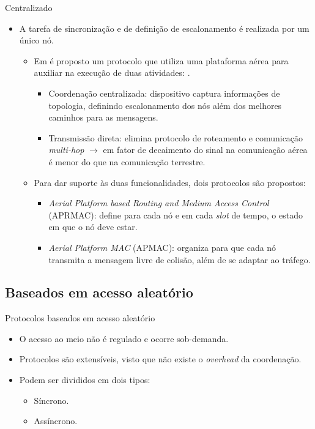 \documentclass{beamer}
\begin{document}
\begin{frame}[allowframebreaks]{Centralizado}
\hypertarget{aerial_back}{}
  \begin{itemize}
    \item A tarefa de sincronização e de definição de escalonamento é realizada por um único nó.
    \begin{itemize}
      \item Em \cite{20100312645920} é proposto um protocolo que utiliza uma plataforma aérea para auxiliar na execução de duas atividades: \hyperlink{aerial}{}.
      \begin{itemize}
	\item Coordenação centralizada: dispositivo captura informações de topologia, definindo escalonamento dos nós além dos melhores caminhos para as mensagens.
	\item Transmissão direta: elimina protocolo de roteamento e comunicação \emph{multi-hop} $\rightarrow$ em fator de decaimento do sinal na comunicação aérea é menor do que 
  na comunicação terrestre.
      \end{itemize}
      \item Para dar suporte às duas funcionalidades, dois protocolos são propostos:%
      \hypertarget{quadro_aerial_back}{}
      \begin{itemize}
	\item \emph{Aerial Platform based Routing and Medium Access Control} (APRMAC): define para cada nó e em cada \emph{slot} de tempo, o estado em que o nó deve estar.
	\item \emph{Aerial Platform MAC} (APMAC): organiza para que cada nó transmita a mensagem livre de colisão, além de se adaptar ao tráfego.
      \end{itemize}
    \end{itemize}
  \end{itemize}
\end{frame}


\subsection{Baseados em acesso aleatório}
\begin{frame}{Protocolos baseados em acesso aleatório}
  \begin{itemize}
    \item O acesso ao meio não é regulado e ocorre sob-demanda.
    \item Protocolos são extensíveis, visto que não existe o \emph{overhead} da coordenação.
    \item Podem ser divididos em dois tipos:
      \begin{itemize}
	\item Síncrono.
	\item Assíncrono.
      \end{itemize}
  \end{itemize}
\end{frame}
\end{document}
